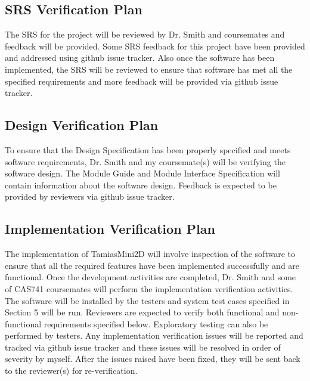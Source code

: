 \documentclass[12pt, titlepage]{article}
\begin{document}
\subsection{SRS Verification Plan}
The SRS for the project will be reviewed by Dr. Smith and coursemates and feedback will be provided. Some SRS feedback for this project have been provided and addressed using github issue tracker. Also once the software has been implemented, the SRS will be reviewed to ensure that software has met all the specified requirements and more feedback will be provided via github issue tracker.


\subsection{Design Verification Plan}
To ensure that the Design Specification has been properly specified and meets software requirements, Dr. Smith and my coursemate(s) will be verifying the software design. The Module Guide and Module Interface Specification will contain information about the software design. Feedback is expected to be provided by reviewers via github issue tracker.

\subsection{Implementation Verification Plan}
 The implementation of TamiasMini2D will involve inspection of the software to ensure that all the required features have been implemented successfully and are functional. Once the development activities are completed, Dr. Smith and some of CAS741 coursemates will perform the implementation verification activities. The software will be installed by the testers and system test cases specified in Section 5 will be run. Reviewers are expected to verify both functional and non-functional requirements specified below. Exploratory testing can also be performed by testers.
 Any implementation verification issues will be reported and tracked via github issue tracker and these issues will be resolved in order of severity by myself. After the issues raised have been fixed, they will be sent back to the reviewer(s) for re-verification.
\end{document}
